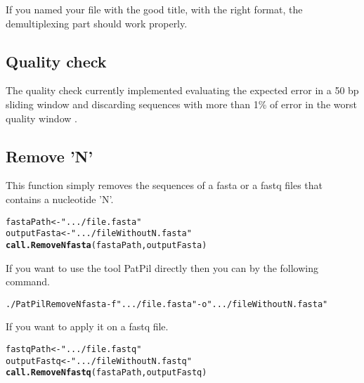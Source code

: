 \documentclass{article}\usepackage[]{graphicx}\usepackage[]{color}
\makeatletter
\newcommand{\hlstr}[1]{\textcolor[rgb]{0.192,0.494,0.8}{#1}}%
\newcommand{\hlstd}[1]{\textcolor[rgb]{0.345,0.345,0.345}{#1}}%
\newcommand{\hlkwb}[1]{\textcolor[rgb]{0.69,0.353,0.396}{#1}}%
\newcommand{\hlkwd}[1]{\textcolor[rgb]{0.737,0.353,0.396}{\textbf{#1}}}%
\newenvironment{kframe}{%
 \def\at@end@of@kframe{}%
 \ifinner\ifhmode%
  \def\at@end@of@kframe{\end{minipage}}%
  \begin{minipage}{\columnwidth}%
 \fi\fi%
 \def\FrameCommand##1{\hskip\@totalleftmargin \hskip-\fboxsep
 \colorbox{shadecolor}{##1}\hskip-\fboxsep
     \hskip-\linewidth \hskip-\@totalleftmargin \hskip\columnwidth}%
 \MakeFramed {\advance\hsize-\width
   \@totalleftmargin\z@ \linewidth\hsize
   \@setminipage}}%
 {\par\unskip\endMakeFramed%
 \at@end@of@kframe}
\newenvironment{knitrout}{}{} %
\makeatother
\begin{document}
If you named your file with the good title, with the right format, the demultiplexing part should work properly.

\subsection{Quality check}
\label{subsec:qualcheck}

The quality check currently implemented evaluating the expected error in a 50 bp sliding window and discarding sequences with more than 1\% of error in the worst quality window \cite{DeVargas2015}.


\subsection{Remove 'N'}

This function simply removes the sequences of a fasta or a fastq files that contains a nucleotide 'N'.

\begin{knitrout}
\color{fgcolor}\begin{kframe}
\begin{alltt}
\hlstd{fastaPath} \hlkwb{<-} \hlstr{".../file.fasta"}
\hlstd{outputFasta} \hlkwb{<-} \hlstr{".../fileWithoutN.fasta"}
\hlkwd{call.RemoveNfasta}\hlstd{(fastaPath,outputFasta)}
\end{alltt}
\end{kframe}
\end{knitrout}

If you want to use the tool PatPil directly then you can by the following command.
\begin{knitrout}
\color{fgcolor}\begin{kframe}
\begin{alltt}
./PatPil RemoveNfasta -f \hlstr{".../file.fasta"} -o \hlstr{".../fileWithoutN.fasta"}
\end{alltt}
\end{kframe}
\end{knitrout}

If you want to apply it on a fastq file.

\begin{knitrout}
\color{fgcolor}\begin{kframe}
\begin{alltt}
\hlstd{fastqPath} \hlkwb{<-} \hlstr{".../file.fastq"}
\hlstd{outputFastq} \hlkwb{<-} \hlstr{".../fileWithoutN.fastq"}
\hlkwd{call.RemoveNfastq}\hlstd{(fastaPath,outputFastq)}
\end{alltt}
\end{kframe}
\end{knitrout}
\end{document}
